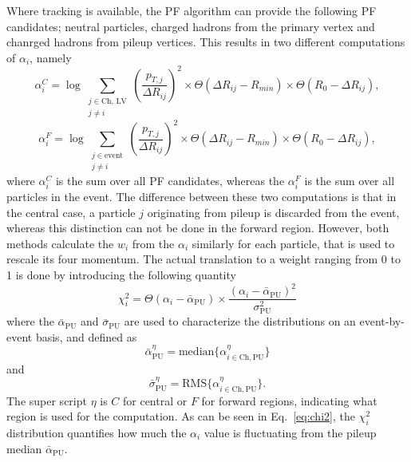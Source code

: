 Where tracking is available, the PF algorithm can provide the following PF candidates; neutral particles, charged hadrons from the primary vertex and chanrged hadrons from pileup vertices.   
This results in two different computations of $\alpha_{i}$, namely
\begin{equation}
  \alpha_i^{C} = \log \sum_{\substack{j \in \text{Ch, LV} \\ j \neq i}} \left(\frac{p_{T, j}}{\Delta R_{ij}}\right)^{2} \times \Theta(\Delta R_{ij}-R_{min})\times \Theta(R_{0}-\Delta R_{ij}),
\end{equation}
\begin{equation}
  \alpha_i^{F} = \log \sum_{\substack{j \in \text{event} \\ j \neq i}} \left(\frac{p_{T, j}}{\Delta R_{ij}}\right)^{2} \times \Theta(\Delta R_{ij}-R_{min})\times \Theta(R_{0}-\Delta R_{ij}),
\end{equation}
where $\alpha_{i}^{C}$ is the sum over all PF candidates, whereas the $\alpha_{i}^{F}$ is the sum over all particles in the event. 
The difference between these two computations is that in the central case, a particle $j$ originating from pileup is discarded from the event, whereas this distinction can not be done in the forward region. 
However, both methods calculate the $w_{i}$ from the $\alpha_{i}$ similarly for each particle, that is used to rescale its four momentum.  
The actual translation to a weight ranging from 0 to 1 is done by introducing the following quantity
\begin{equation}
\chi_i^2=\Theta(\alpha_{i}-\bar{\alpha}_{\text{PU}})\times \frac{(\alpha_{i}-\bar{\alpha}_{\mathrm{PU}})^{2}}{\sigma_{\mathrm{PU}}^{2}}
\label{eq:chi2}
\end{equation}
where the $\bar{\alpha}_{\text{PU}}$ and $\bar{\sigma}_{\text{PU}}$ are used to characterize the distributions on an event-by-event basis, and defined as
\begin{equation}
\bar{\alpha}_{\text{PU}}^{\eta}= \mathrm{median}\{\alpha_{i\in \mathrm{Ch, PU}}^{\eta}\} 
\end{equation}
and
\begin{equation}
\bar{\sigma}_{\text{PU}}^{\eta}= \mathrm{RMS}\{\alpha_{i\in \mathrm{Ch, PU}}^{\eta}\}.
\end{equation} 
The super script $\eta$ is $C$ for central or $F$ for forward regions, indicating what region is used for the computation. 
As can be seen in Eq.~\ref{eq:chi2}, the $\chi_i^2$ distribution quantifies how much the $\alpha_i$ value is fluctuating from the pileup median $\bar{\alpha}_{\text{PU}}$. 
